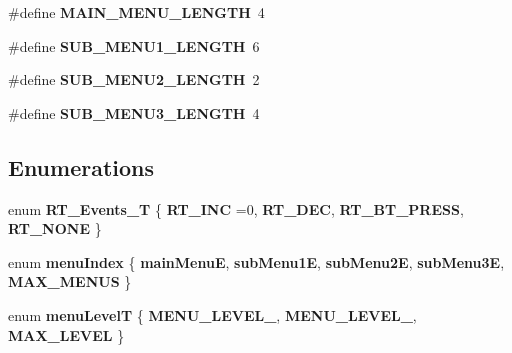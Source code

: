 \begin{DoxyCompactItemize}
\#define {\bfseries M\+A\+I\+N\+\_\+\+M\+E\+N\+U\+\_\+\+L\+E\+N\+G\+TH}~4
\item 
\mbox{\label{group___ventilator_module_ga7445156cd52aa54bfb70f3132a35d6f7}} 
\#define {\bfseries S\+U\+B\+\_\+\+M\+E\+N\+U1\+\_\+\+L\+E\+N\+G\+TH}~6
\item 
\mbox{\label{group___ventilator_module_ga54f9aae8a37a9810c0af2a3448d6fdeb}} 
\#define {\bfseries S\+U\+B\+\_\+\+M\+E\+N\+U2\+\_\+\+L\+E\+N\+G\+TH}~2
\item 
\mbox{\label{group___ventilator_module_ga2dd9a1fad9e26682948d5d30be0ccdf6}} 
\#define {\bfseries S\+U\+B\+\_\+\+M\+E\+N\+U3\+\_\+\+L\+E\+N\+G\+TH}~4
\end{DoxyCompactItemize}
\subsection*{Enumerations}
\begin{DoxyCompactItemize}
\item 
\mbox{\label{group___ventilator_module_ga1c94f2d77e3ab02f07b5b68016d9a24a}} 
enum {\bfseries R\+T\+\_\+\+Events\+\_\+T} \{ {\bfseries R\+T\+\_\+\+I\+NC} =0, 
{\bfseries R\+T\+\_\+\+D\+EC}, 
{\bfseries R\+T\+\_\+\+B\+T\+\_\+\+P\+R\+E\+SS}, 
{\bfseries R\+T\+\_\+\+N\+O\+NE}
 \}
\item 
\mbox{\label{group___ventilator_module_ga07b7149f82394109642a68e4ed984d31}} 
enum {\bfseries menu\+Index} \{ \newline
{\bfseries main\+MenuE}, 
{\bfseries sub\+Menu1E}, 
{\bfseries sub\+Menu2E}, 
{\bfseries sub\+Menu3E}, 
\newline
{\bfseries M\+A\+X\+\_\+\+M\+E\+N\+US}
 \}
\item 
\mbox{\label{group___ventilator_module_ga6011a7e094920cec8197767df5be0553}} 
enum {\bfseries menu\+LevelT} \{ {\bfseries M\+E\+N\+U\+\_\+\+L\+E\+V\+E\+L\+\_}, 
{\bfseries M\+E\+N\+U\+\_\+\+L\+E\+V\+E\+L\+\_}, 
{\bfseries M\+A\+X\+\_\+\+L\+E\+V\+EL}
 \}
\end{DoxyCompactItemize}
